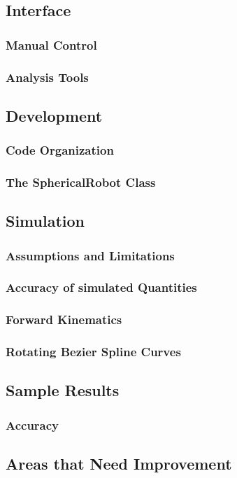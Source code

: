 \subsection{Interface}
\subsubsection{Manual Control}
\subsubsection{Analysis Tools}
\subsection{Development}
\subsubsection{Code Organization}
\subsubsection{The SphericalRobot Class}
\subsection{Simulation}
\subsubsection{Assumptions and Limitations}
\subsubsection{Accuracy of simulated Quantities}
\subsubsection{Forward Kinematics}
\subsubsection{Rotating Bezier Spline Curves}
\subsection{Sample Results}
\subsubsection{Accuracy}
\subsection{Areas that Need Improvement}

